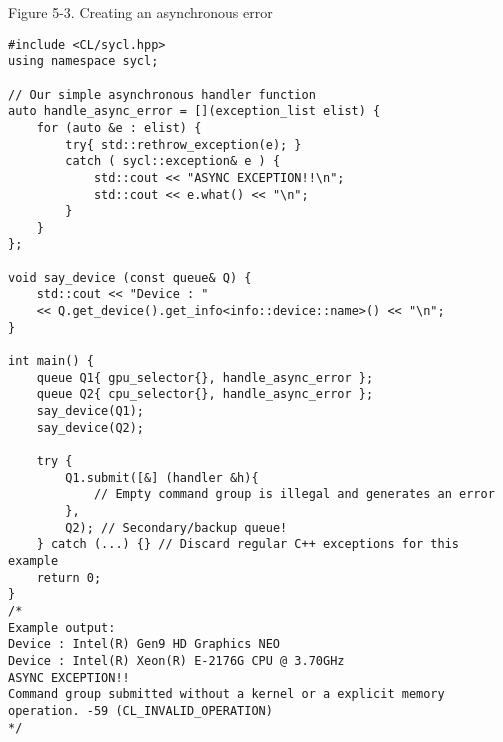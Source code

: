 \hspace*{\fill} \par %
Figure 5-3. Creating an asynchronous error
\begin{lstlisting}[caption={}]
#include <CL/sycl.hpp>
using namespace sycl;

// Our simple asynchronous handler function
auto handle_async_error = [](exception_list elist) {
	for (auto &e : elist) {
		try{ std::rethrow_exception(e); }
		catch ( sycl::exception& e ) {
			std::cout << "ASYNC EXCEPTION!!\n";
			std::cout << e.what() << "\n";
		}
	}
};

void say_device (const queue& Q) {
	std::cout << "Device : "
	<< Q.get_device().get_info<info::device::name>() << "\n";
}

int main() { 
	queue Q1{ gpu_selector{}, handle_async_error };
	queue Q2{ cpu_selector{}, handle_async_error };
	say_device(Q1);
	say_device(Q2);
	
	try {
		Q1.submit([&] (handler &h){
			// Empty command group is illegal and generates an error
		},
		Q2); // Secondary/backup queue!
	} catch (...) {} // Discard regular C++ exceptions for this example
	return 0;
}
/*
Example output:
Device : Intel(R) Gen9 HD Graphics NEO
Device : Intel(R) Xeon(R) E-2176G CPU @ 3.70GHz
ASYNC EXCEPTION!!
Command group submitted without a kernel or a explicit memory operation. -59 (CL_INVALID_OPERATION)
*/
\end{lstlisting}






